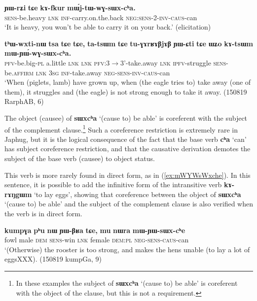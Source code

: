 \documentclass[oneside,a4paper,11pt]{article}
\newcommand{\ipa}[1]{\textbf{\phon#1}} %
\newcommand{\jpg}[2]{\ipa{#1} `#2'} %
\newcommand{\refb}[1]{(\ref{#1})}
\begin{document}
\begin{exe}
\ex \label{ex:mWjtWwGsWxcha}
\gll \ipa{ɲɯ-rʑi} 	\ipa{tɕe} 	\ipa{kɤ-fkur}  	\ipa{mɯ́j-tɯ-wɣ-sɯx-cʰa.} \\
\textsc{sens}-be.heavy \textsc{lnk}  \textsc{inf}-carry.on.the.back \textsc{neg:sens-2-inv-caus}-can \\
\glt `It is heavy, you won't be able to carry it on your back.' (elicitation)
\end{exe}	

  
\begin{exe}
\ex \label{ex:mWYWwGsWxcha}
\gll \ipa{tʰɯ-wxti-nɯ} 	\ipa{tsa} 	\ipa{tɕe} 	\ipa{tɕe,} 	\ipa{ta-tsɯm} 	\ipa{tɕe} 	\ipa{tu-ɣɤrʁɤβjɤβ} 	\ipa{ɲɯ-ɕti} 	\ipa{tɕe} 	\ipa{ɯʑo} 	\ipa{kɤ-tsɯm} 	\ipa{mɯ-ɲɯ́-wɣ-sɯx-cʰa.} \\
\textsc{pfv}-be.big-\textsc{pl} a.little \textsc{lnk}  \textsc{lnk} \textsc{pfv}:3$\rightarrow$3'-take.away \textsc{lnk} \textsc{ipfv}-struggle \textsc{sens}-be.\textsc{affirm}   \textsc{lnk} \textsc{3sg} \textsc{inf}-take.away \textsc{neg-sens-inv-caus}-can \\
\glt `When (piglets, lamb) have grown up, when (the eagle tries to) take away (one of them), it struggles and (the eagle) is not strong enough to take it away. (150819 RarphAB, 6)
\end{exe}	

The object (causee) of \jpg{sɯxcʰa}{(cause to) be able}  is coreferent with the subject of the complement clause.\footnote{In these examples the subject of \jpg{sɯxcʰa}{(cause to) be able} is coreferent with the object of the clause, but this is not a requirement.} Such a coreference restriction is extremely rare in Japhug, but it is the logical consequence of the fact that the base verb \jpg{cʰa}{can} has subject coreference restriction, and that the causative derivation demotes the subject of the base verb (causee) to object status.

This verb is more rarely found in direct form, as in \refb{ex:mWYWsWxche}. In this sentence, it is possible to add the infinitive form of the intransitive verb \jpg{kɤ-rɤŋgɯm}{to lay eggs}, showing that coreference between the object of \jpg{sɯxcʰa}{(cause to) be able} and the subject of the complement clause is also verified when the verb is in direct form.

\begin{exe}
\ex \label{ex:mWYWsWxche}
\gll 
\ipa{kumpɣa} 	\ipa{pʰu} 	\ipa{nɯ} 	\ipa{ɲɯ-βʁa} 	\ipa{tɕe,} 	\ipa{mu} 	\ipa{nɯra} 	\ipa{mɯ-ɲɯ-sɯx-cʰe} \\
fowl male \textsc{dem} \textsc{sens}-win \textsc{lnk} female \textsc{dem:pl} \textsc{neg-sens-caus}-can \\
\glt `(Otherwise) the rooster is too strong, and makes the hens unable (to lay a lot of eggsXXX). (150819 kumpGa, 9)
\end{exe}
 
\end{document}
